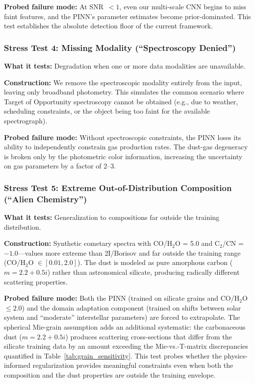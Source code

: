 \documentclass[usenatbib]{mnras}
\begin{document}
\textbf{Probed failure mode:} At SNR~$<1$, even our multi-scale CNN begins to miss faint features, and the PINN's parameter estimates become prior-dominated. This test establishes the absolute detection floor of the current framework.

\subsubsection{Stress Test 4: Missing Modality (``Spectroscopy Denied'')}

\textbf{What it tests:} Degradation when one or more data modalities are unavailable.

\textbf{Construction:} We remove the spectroscopic modality entirely from the input, leaving only broadband photometry. This simulates the common scenario where Target of Opportunity spectroscopy cannot be obtained (e.g., due to weather, scheduling constraints, or the object being too faint for the available spectrograph).

\textbf{Probed failure mode:} Without spectroscopic constraints, the PINN loses its ability to independently constrain gas production rates. The dust-gas degeneracy is broken only by the photometric color information, increasing the uncertainty on gas parameters by a factor of 2--3.

\subsubsection{Stress Test 5: Extreme Out-of-Distribution Composition (``Alien Chemistry'')}

\textbf{What it tests:} Generalization to compositions far outside the training distribution.

\textbf{Construction:} Synthetic cometary spectra with CO/H$_2$O = 5.0 and C$_2$/CN = $-1.0$---values more extreme than 2I/Borisov and far outside the training range (CO/H$_2$O $\in [0.01, 2.0]$). The dust is modeled as pure amorphous carbon ($m = 2.2 + 0.5i$) rather than astronomical silicate, producing radically different scattering properties.

\textbf{Probed failure mode:} Both the PINN (trained on silicate grains and CO/H$_2$O $\leq 2.0$) and the domain adaptation component (trained on shifts between solar system and ``moderate'' interstellar parameters) are forced to extrapolate. The spherical Mie-grain assumption adds an additional systematic: the carbonaceous dust ($m = 2.2 + 0.5i$) produces scattering cross-sections that differ from the silicate training data by an amount exceeding the Mie-vs.-T-matrix discrepancies quantified in Table~\ref{tab:grain_sensitivity}. This test probes whether the physics-informed regularization provides meaningful constraints even when both the composition and the dust properties are outside the training envelope.
\end{document}
